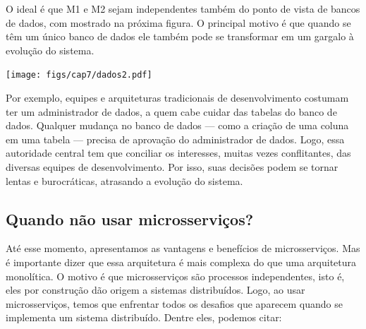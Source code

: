\documentclass[
  11pt,
  twoside]{book}
\begin{document}
O ideal é que M1 e M2 sejam independentes também do ponto de vista de
bancos de dados, com mostrado na próxima figura. O principal motivo é
que quando se têm um único banco de dados ele também pode se transformar
em um gargalo à evolução do sistema.

\begin{center}

\texttt{[image: figs/cap7/dados2.pdf]}

\end{center}

Por exemplo, equipes e arquiteturas tradicionais de desenvolvimento
costumam ter um administrador de dados, a quem cabe cuidar das tabelas
do banco de dados. Qualquer mudança no banco de dados --- como a criação
de uma coluna em uma tabela --- precisa de aprovação do administrador de
dados. Logo, essa autoridade central tem que conciliar os interesses,
muitas vezes conflitantes, das diversas equipes de desenvolvimento. Por
isso, suas decisões podem se tornar lentas e burocráticas, atrasando a
evolução do sistema.

\hypertarget{quando-nuxe3o-usar-microsserviuxe7os}{%
\subsection{Quando não usar
microsserviços?}\label{quando-nuxe3o-usar-microsserviuxe7os}}


Até esse momento, apresentamos as vantagens e benefícios de
microsserviços. Mas é importante dizer que essa arquitetura é mais
complexa do que uma arquitetura monolítica. O motivo é que
microsserviços são processos independentes, isto é, eles por construção
dão origem a sistemas distribuídos. Logo, ao usar microsserviços, temos
que enfrentar todos os desafios que aparecem quando se implementa um
sistema distribuído. Dentre eles, podemos citar:
\end{document}
